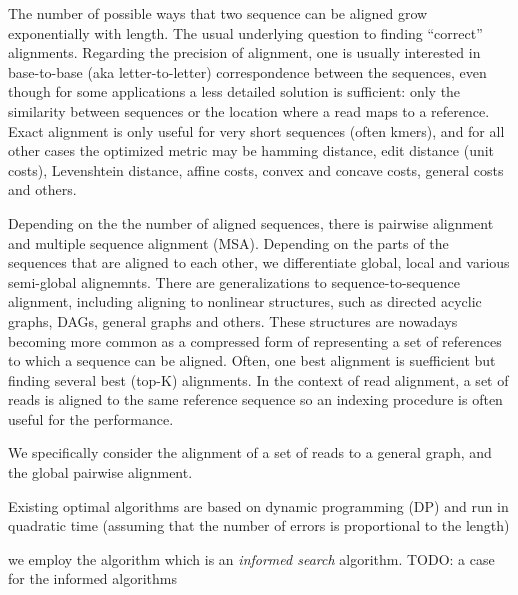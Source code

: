 
The number of possible ways that two sequence can be aligned grow exponentially
with length. The usual underlying question to finding ``correct'' alignments.
Regarding the precision of alignment, one is usually interested in base-to-base
(aka letter-to-letter) correspondence between the sequences, even though for
some applications a less detailed solution is sufficient: only the similarity
between sequences or the location where a read maps to a reference. Exact
alignment is only useful for very short sequences (often kmers), and for all
other cases the optimized metric may be hamming distance, edit distance (unit
costs), Levenshtein distance, affine costs, convex and concave costs, general
costs and others. 

Depending on the the number of aligned sequences, there is pairwise alignment
and multiple sequence alignment (MSA). Depending on the parts of the sequences
that are aligned to each other, we differentiate global, local and various
semi-global alignemnts. There are generalizations to sequence-to-sequence
alignment, including aligning to nonlinear structures, such as directed acyclic
graphs, DAGs, general graphs and others. These structures are nowadays becoming
more common as a compressed form of representing a set of references to which a
sequence can be aligned. Often, one best alignment is suefficient but finding
several best (top-K) alignments. In the context of read alignment, a set of reads
is aligned to the same reference sequence so an indexing procedure is often
useful for the performance.

We specifically consider the alignment of a set of reads to a general graph, and
the global pairwise alignment.

Existing optimal algorithms are based on dynamic programming (DP) and
run in quadratic time (assuming that the number of errors is proportional to the
length)

we employ the \A algorithm which is an \emph{informed search} algorithm.
TODO: a case for the informed algorithms

